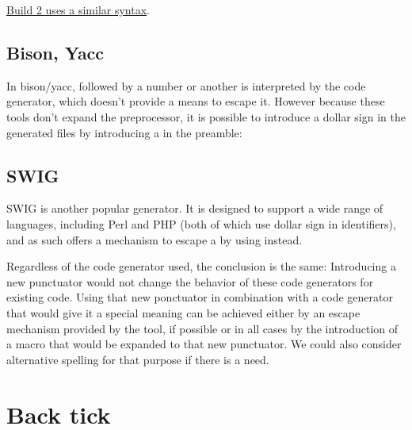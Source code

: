 \documentclass{wg21}
\begin{document}
    \href{https://build2.org/build2/doc/build2-build-system-manual.xhtml#module-in}{Build 2 uses a similar syntax}.
    
    \subsection{Bison, Yacc}
    
    In bison/yacc, \tcode{\$} followed by a number or another \tcode{\$} is interpreted by the code generator, which doesn't provide a means to escape it.
    However because these tools don't expand the preprocessor, it is possible to introduce a dollar sign in the generated files by introducing a  in the preamble:
    
    
    \subsection{SWIG}
    
    SWIG is another popular generator. It is designed to support a wide range of languages, including Perl and PHP (both of which use dollar sign in identifiers), and as such offers
    a mechanism to escape a \tcode{\$} by using \tcode{\textbackslash \$} instead.
    
    Regardless of the code generator used, the conclusion is the same:
    Introducing a new punctuator would not change the behavior of these code generators for existing code.
    Using that new ponctuator in combination with a code generator that would give it a special meaning can be achieved either by an escape mechanism provided by the tool, if possible or in all cases by the introduction of a macro that would be expanded to that new punctuator.
    We could also consider alternative spelling for that purpose if there is a need.
    
    \section{\textasciigrave Back tick\textasciigrave}
    
\end{document}
